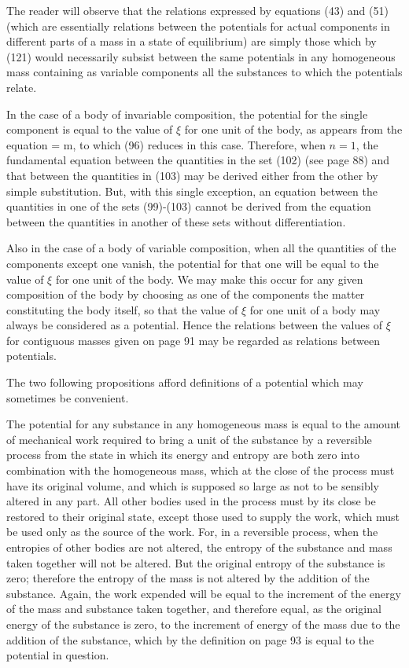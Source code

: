 \documentclass[12pt]{memoir}
\begin{document}
The reader will observe that the relations expressed by equations (43) and (51) (which are essentially relations between the potentials for actual components in different parts of a mass in a state of equilibrium) are simply those which by (121) would necessarily subsist between the same potentials in any homogeneous mass containing as variable components all the substances to which the potentials relate.


In the case of a body of invariable composition, the potential for the single component is equal to the value of $\xi$ for one unit of the body, as appears from the equation
\eqs \xi= \mu m,  \label{122}\eqe
to which (96) reduces in this case. Therefore, when $n = 1$, the fundamental equation between the quantities in the set (102) (see page 88) and that between the quantities in (103) may be derived either from the other by simple substitution. But, with this single exception, an equation between the quantities in one of the sets (99)-(103) cannot be derived from the equation between the quantities in another of these sets without differentiation.


Also in the case of a body of variable composition, when all the quantities of the components except one vanish, the potential for that one will be equal to the value of $\xi$ for one unit of the body. We may make this occur for any given composition of the body by choosing as one of the components the matter constituting the body itself, so that the value of $\xi$ for one unit of a body may always be considered as a potential. Hence the relations between the values of $\xi$ for contiguous masses given on page 91 may be regarded as relations between potentials.


The two following propositions afford definitions of a potential
which may sometimes be convenient.


The potential for any substance in any homogeneous mass is equal to the amount of mechanical work required to bring a unit of the substance by a reversible process from the state in which its energy and entropy are both zero into combination with the homogeneous mass, which at the close of the process must have its original volume, and which is supposed so large as not to be sensibly altered in any part. All other bodies used in the process must by its close be restored to their original state, except those used to supply the work, which must be used only as the source of the work. For, in a reversible process, when the entropies of other bodies are not altered, the entropy of the substance and mass taken together will not be altered. But the original entropy of the substance is zero; therefore the entropy of the mass is not altered by the addition of the substance. Again, the work expended will be equal to the increment of the energy of the mass and substance taken together, and therefore equal, as the original energy of the substance is zero, to the increment of energy of the mass due to the addition of the substance, which by the definition on page 93 is equal to the potential in question.
\end{document}
